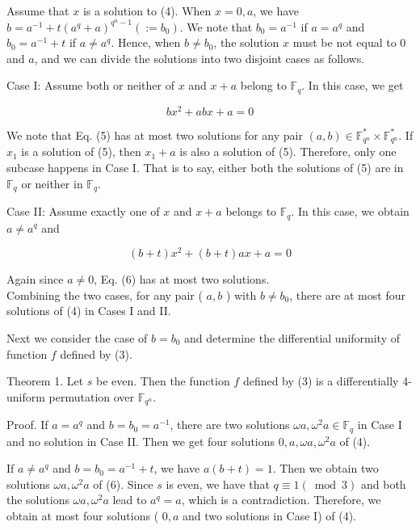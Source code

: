 \documentclass[10pt]{article}
\begin{document}
Assume that $x$ is a solution to (4). When $x=0, a$, we have $b=a^{-1}+t\left(a^{q}+a\right)^{q^{n}-1}\left(:=b_{0}\right)$. We note that $b_{0}=a^{-1}$ if $a=a^{q}$ and $b_{0}=a^{-1}+t$ if $a \neq a^{q}$. Hence, when $b \neq b_{0}$, the solution $x$ must be not equal to 0 and $a$, and we can divide the solutions into two disjoint cases as follows.

Case I: Assume both or neither of $x$ and $x+a$ belong to $\mathbb{F}_{q}$. In this case, we get


\begin{equation*}
b x^{2}+a b x+a=0 \tag{5}
\end{equation*}


We note that Eq. (5) has at most two solutions for any pair $(a, b) \in \mathbb{F}_{q^{n}}^{*} \times \mathbb{F}_{q^{n}}^{*}$. If $x_{1}$ is a solution of (5), then $x_{1}+a$ is also a solution of (5). Therefore, only one subcase happens in Case I. That is to say, either both the solutions of (5) are in $\mathbb{F}_{q}$ or neither in $\mathbb{F}_{q}$.

Case II: Assume exactly one of $x$ and $x+a$ belongs to $\mathbb{F}_{q}$. In this case, we obtain $a \neq a^{q}$ and


\begin{equation*}
(b+t) x^{2}+(b+t) a x+a=0 \tag{6}
\end{equation*}


Again since $a \neq 0$, Eq. (6) has at most two solutions.\\
Combining the two cases, for any pair ( $a, b$ ) with $b \neq b_{0}$, there are at most four solutions of (4) in Cases I and II.

Next we consider the case of $b=b_{0}$ and determine the differential uniformity of function $f$ defined by (3).

Theorem 1. Let $s$ be even. Then the function $f$ defined by (3) is a differentially 4-uniform permutation over $\mathbb{F}_{q^{n}}$.

Proof. If $a=a^{q}$ and $b=b_{0}=a^{-1}$, there are two solutions $\omega a, \omega^{2} a \in \mathbb{F}_{q}$ in Case I and no solution in Case II. Then we get four solutions $0, a, \omega a, \omega^{2} a$ of (4).

If $a \neq a^{q}$ and $b=b_{0}=a^{-1}+t$, we have $a(b+t)=1$. Then we obtain two solutions $\omega a, \omega^{2} a$ of (6). Since $s$ is even, we have that $q \equiv 1(\bmod 3)$ and both the solutions $\omega a, \omega^{2} a$ lead to $a^{q}=a$, which is a contradiction. Therefore, we obtain at most four solutions ( $0, a$ and two solutions in Case I) of (4).
\end{document}
